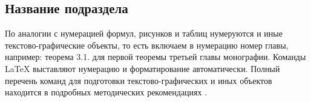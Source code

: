\begin{refsection}
	
	\section{Название подраздела} \label{ch-11:sec-very-short-title} %


	


%










 

По аналогии с нумерацией формул, рисунков и таблиц нумеруются и иные текстово-графические объекты, то есть включаем в нумерацию номер главы, например: теорема 3.1. для первой теоремы третьей главы монографии. Команды \LaTeX{} выставляют нумерацию и форматирование автоматически. Полный перечень команд для подготовки текстово-графических и иных объектов находится в подробных методических рекомендациях \cite{spbpu-bci-template-author-guide}. 












\end{refsection}

